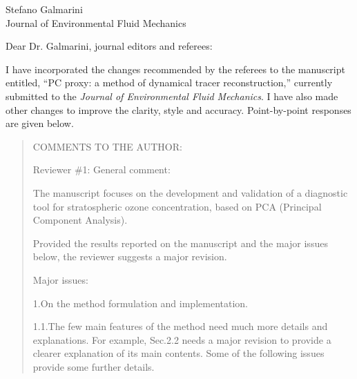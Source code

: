 \documentclass{letter}
\begin{document}
\begin{letter}{Stefano Galmarini\\
Journal of Environmental Fluid Mechanics}

\opening{Dear Dr. Galmarini, journal editors and referees:}

I have incorporated the changes recommended by the referees to the manuscript
entitled, ``PC proxy: a method of dynamical tracer reconstruction,'' currently
submitted to the {\it Journal of Environmental Fluid Mechanics}. 
I have also made other changes to improve the clarity, style and accuracy.
Point-by-point responses are given below.

\begin{quote}
COMMENTS TO THE AUTHOR:

Reviewer \#1: General comment:

The manuscript focuses on the development and validation of a diagnostic tool for stratospheric ozone concentration, based on PCA (Principal Component Analysis).

Provided the results reported on the manuscript and the major issues below, the reviewer suggests a major revision.

Major issues:

1.On the method formulation and implementation.

1.1.The few main features of the method need much more details and explanations. For example, Sec.2.2 needs a major revision to provide a clearer explanation of its main contents. Some of the following issues provide some further details.


\end{quote}
\end{letter}
\end{document}
